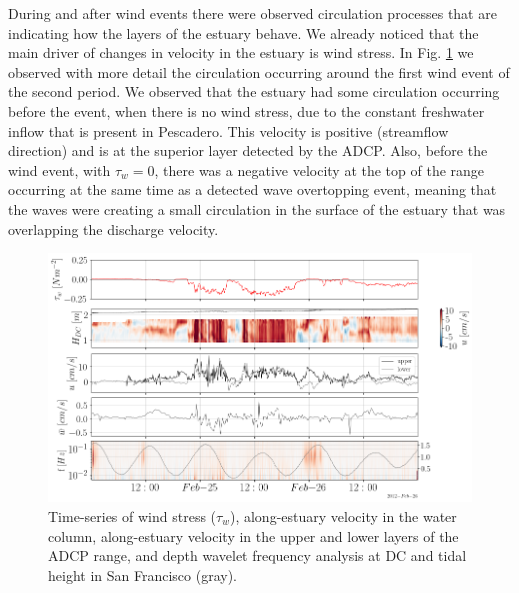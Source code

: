 \documentclass[tesis.tex]{subfiles}
\begin{document}
During and after wind events there were observed circulation processes that are indicating how the layers of the estuary behave. We already noticed that the main driver of changes in velocity in the estuary is wind stress. In Fig. \ref{fig:velwind} we observed with more detail the circulation occurring around the first wind event of the second period. We observed that the estuary had some circulation occurring before the event, when there is no wind stress, due to the constant freshwater inflow that is present in Pescadero. This velocity is positive (streamflow direction) and is at the superior layer detected by the ADCP. Also, before the wind event, with $\tau_w =0$, there was a negative velocity at the top of the range occurring at the same time as a detected wave overtopping event, meaning that the waves were creating a small circulation in the surface of the estuary that was overlapping the discharge velocity.\\

\begin{figure}[h!]
    \centering
    \includegraphics[width=\textwidth]{Imagenes/vel_wind.png}
    \caption{Time-series of wind stress ($\tau_w$), along-estuary velocity in the water column, along-estuary velocity in the upper and lower layers of the ADCP range, and depth wavelet frequency analysis at DC and tidal height in San Francisco (gray). }
    \label{fig:velwind}
\end{figure}
\end{document}
